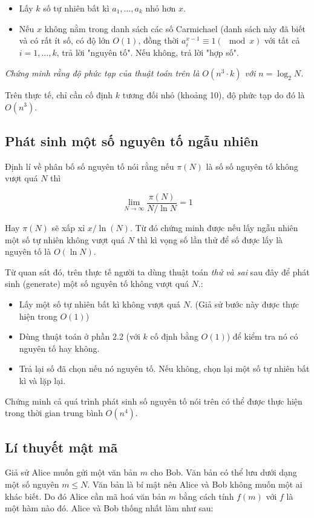 \documentclass{article}
\begin{document}
\begin{itemize}
    \item Lấy $k$ số tự nhiên bất kì $a_1, \ldots, a_k$ nhỏ hơn $x$.
    \item Nếu $x$ không nằm trong danh sách các số Carmichael (danh sách này đã biết và có rất ít số, có độ lớn $O(1)$, đồng thời $a_i^{x-1} \equiv 1 (\mod x)$ với tất cả $i = 1, \ldots, k$, trả lời "nguyên tố". Nếu không, trả lời "hợp số".
\end{itemize}

\textit{Chứng minh rằng độ phức tạp của thuật toán trên là $O(n^3\cdot k)$ với $n = \log_2 N$. }

Trên thực tế, chỉ cần cố định $k$ tương đối nhỏ (khoảng 10), độ phức tạp do đó là $O(n^3)$.

\subsection{Phát sinh một số nguyên tố ngẫu nhiên}
Định lí về phân bố số nguyên tố nói rằng nếu $\pi(N)$ là số số nguyên tố không vượt quá $N$ thì

$$
\lim\limits_{N\to \infty} \frac{\pi(N)}{N/\ln N} = 1 
$$

Hay $\pi(N)$ sẽ xấp xỉ $x/\ln(N)$. Từ đó chứng minh được nếu lấy ngẫu nhiên một số tự nhiên không vượt quá $N$ thì kì vọng số lần thử để số được lấy là nguyên tố là $O(\ln N)$.

Từ quan sát đó, trên thực tế người ta dùng thuật toán \textit{thử và sai} sau đây để phát sinh (generate) một số nguyên tố không vượt quá $N$.:

\begin{itemize}
    \item Lấy một số tự nhiên bất kì không vượt quá $N$. (Giả sử bước này được thực hiện trong $O(1)$)
    \item Dùng thuật toán ở phần 2.2 (với $k$ cố định bằng $O(1)$) để kiểm tra nó có nguyên tố hay không. 
    \item Trả lại số đã chọn nếu nó nguyên tố. Nếu không, chọn lại một số tự nhiên bất kì và lặp lại.
\end{itemize}

\begin{em}
    Chứng minh cả quá trình phát sinh số nguyên tố nói trên có thể được thực hiện trong thời gian trung bình $O(n^4)$.
\end{em}

\subsection{Lí thuyết mật mã}
Giả sử Alice muốn gửi một văn bản $m$ cho Bob. Văn bản có thể lưu dưới dạng một số nguyên $m \leq N$. Văn bản là bí mật nên Alice và Bob không muốn một ai khác biết. Do đó Alice cần mã hoá văn bản $m$ bằng cách tính $f(m)$ với $f$ là một hàm nào đó. Alice và Bob thống nhất làm như sau:
\end{document}
